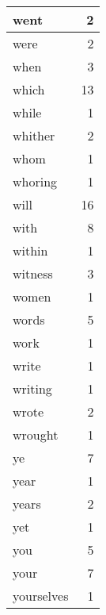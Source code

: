 \begin{center}
\begin{longtable}{l|r}
went & 2 \\ \hline
were & 2 \\ \hline
when & 3 \\ \hline
which & 13 \\ \hline
while & 1 \\ \hline
whither & 2 \\ \hline
whom & 1 \\ \hline
whoring & 1 \\ \hline
will & 16 \\ \hline
with & 8 \\ \hline
within & 1 \\ \hline
witness & 3 \\ \hline
women & 1 \\ \hline
words & 5 \\ \hline
work & 1 \\ \hline
write & 1 \\ \hline
writing & 1 \\ \hline
wrote & 2 \\ \hline
wrought & 1 \\ \hline
ye & 7 \\ \hline
year & 1 \\ \hline
years & 2 \\ \hline
yet & 1 \\ \hline
you & 5 \\ \hline
your & 7 \\ \hline
yourselves & 1 \\ \hline
\end{longtable}
\end{center}



\normalsize



